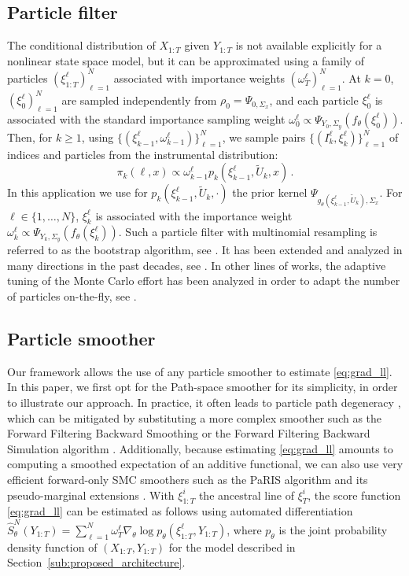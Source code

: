 \documentclass[conference]{IEEEtran}
\begin{document}
\subsection{Particle filter}
The conditional distribution of $X_{1:T}$ given $Y_{1:T}$ is not available explicitly for a nonlinear state space model, but it can be approximated using a family of particles $(\xi^{\ell}_{1:T})_{\ell=1}^N$ associated with importance weights $(\omega^{\ell}_T)_{\ell=1}^N$.
At $k = 0$, $(\xi^{\ell}_0)_{\ell=1}^N$ are sampled independently from $\rho_0 = \Psi_{0, \Sigma_x}$, and each particle $\xi^{\ell}_0$ is associated with the standard importance sampling weight $\omega_0^{\ell} \propto  \Psi_{Y_0, \Sigma_y}(f_\theta(\xi^{\ell}_0))$.
Then, for $k\geq 1$, using $\{(\xi^{\ell}_{k-1},\omega^{\ell}_{k-1})\}_{\ell=1}^N$, we sample pairs $\{(I^{\ell}_k,\xi^{\ell}_{k})\}_{\ell=1}^N$ of indices and particles from the instrumental distribution:
\[
	\pi_{k}(\ell,x) \propto \omega_{k-1}^{\ell} p_k(\xi^{\ell}_{k-1},\widetilde U_k,x)\,.
\]
In this application we use for $p_k(\xi^{\ell}_{k-1},\widetilde U_k,\cdot)$ the prior kernel $\Psi_{g_\theta(\xi^\ell_{k-1}, \tilde U_k), \Sigma_x}$.
For $\ell \in \{1,\ldots,N\}$, $\xi^{\ell}_k$ is associated with the importance weight $\omega^{\ell}_k \propto \Psi_{Y_k, \Sigma_y}(f_\theta(\xi^{\ell}_k))$. Such a particle filter with multinomial resampling is referred to as the bootstrap algorithm, see \cite{gordon1993novel}. It has been extended and analyzed in many directions in the past decades, see \cite{pitt1999filtering,douc2005comparison,Chopin_2020}. In other lines of works, the adaptive tuning of the Monte Carlo effort has been analyzed in order to  adapt the
number of particles on-the-fly, see \cite{elvira2016adapting,elvira2021performance}.

\subsection{Particle smoother}
Our framework allows the use of any particle smoother to estimate \eqref{eq:grad_ll}.
In this paper, we first opt for the Path-space smoother \cite{Kitagawa1996} for its simplicity, in order to illustrate our approach.
In practice, it often leads to particle path degeneracy \cite{Andrieu2005}, which can be mitigated by substituting a more complex smoother such as the Forward Filtering Backward Smoothing \cite{Doucet2000OnSM} or the Forward Filtering Backward Simulation algorithm \cite{Godsill2004MonteCS}.
Additionally, because estimating \eqref{eq:grad_ll} amounts to computing a smoothed expectation of an additive functional, we can also use very efficient forward-only SMC smoothers such as the PaRIS algorithm and its pseudo-marginal extensions \cite{Olsson2014EfficientPO,gloaguen2022pseudo}. With $\xi^i_{1:T}$ the ancestral line of $\xi^i_{T}$, the score function \eqref{eq:grad_ll} can be estimated as follows using automated differentiation $\widehat {S}^N_\theta(Y_{1:T}) = \sum_{\ell=1}^N \omega_T^\ell\nabla_\theta\log p_\theta(\xi^\ell_{1:T}, Y_{1:T})$,  where $p_\theta$ is the joint probability density function of $(X_{1:T}, Y_{1:T})$ for the model described in Section~\ref{sub:proposed_architecture}.
\end{document}
